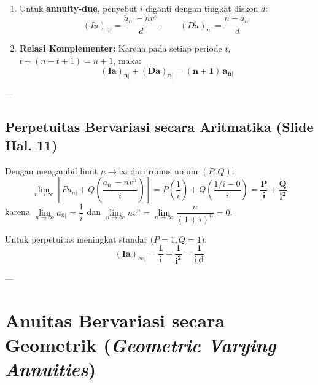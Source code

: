 \documentclass[11pt,a4paper]{article}
\begin{document}
\begin{notebox}
\begin{enumerate}
    \item Untuk \textbf{annuity-due}, penyebut $i$ diganti dengan tingkat diskon $d$:
    \begin{equation}
        (I\ddot{a})_{\overline{n}|} = \frac{\ddot{a}_{\overline{n}|} - n v^n}{d}, \qquad (D\ddot{a})_{\overline{n}|} = \frac{n - a_{\overline{n}|}}{d}
    \end{equation}
    \item \textbf{Relasi Komplementer:} Karena pada setiap periode $t$, $t + (n - t + 1) = n + 1$, maka:
    \begin{equation}
        \mathbf{(Ia)_{\overline{n}|} + (Da)_{\overline{n}|} = (n+1) \, a_{\overline{n}|}}
    \end{equation}
\end{enumerate}
\end{notebox}

---

\subsection{Perpetuitas Bervariasi secara Aritmatika (Slide Hal. 11)}

Dengan mengambil limit $n \to \infty$ dari rumus umum $(P, Q)$:
\begin{equation}
    \lim_{n \to \infty} \left[ P a_{\overline{n}|} + Q \left( \frac{a_{\overline{n}|} - n v^n}{i} \right) \right] = P \left(\frac{1}{i}\right) + Q \left(\frac{1/i - 0}{i}\right) = \mathbf{\frac{P}{i} + \frac{Q}{i^2}}
\end{equation}
karena $\lim\limits_{n \to \infty} a_{\overline{n}|} = \dfrac{1}{i}$ dan $\lim\limits_{n \to \infty} n v^n = \lim\limits_{n \to \infty} \dfrac{n}{(1+i)^n} = 0$.

Untuk perpetuitas meningkat standar ($P=1, Q=1$):
\begin{equation}
    \mathbf{(Ia)_{\overline{\infty}|} = \frac{1}{i} + \frac{1}{i^2} = \frac{1}{i \, d}}
\end{equation}

---

\section{Anuitas Bervariasi secara Geometrik (\textit{Geometric Varying Annuities})}
\end{document}
